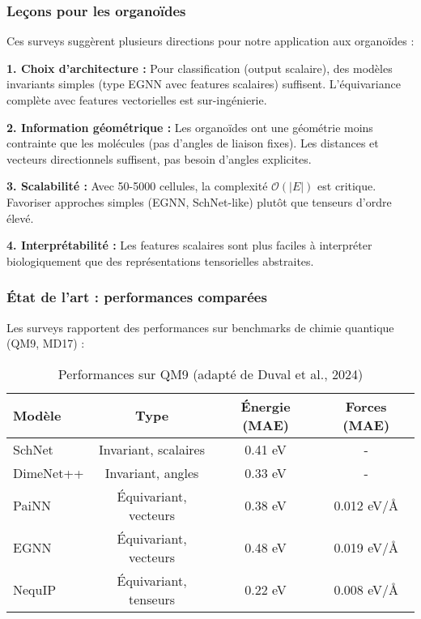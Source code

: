 \subsubsection{Leçons pour les organoïdes}

Ces surveys suggèrent plusieurs directions pour notre application aux organoïdes :

\textbf{1. Choix d'architecture :}
Pour classification (output scalaire), des modèles invariants simples (type EGNN avec features scalaires) suffisent. L'équivariance complète avec features vectorielles est sur-ingénierie.

\textbf{2. Information géométrique :}
Les organoïdes ont une géométrie moins contrainte que les molécules (pas d'angles de liaison fixes). Les distances et vecteurs directionnels suffisent, pas besoin d'angles explicites.

\textbf{3. Scalabilité :}
Avec 50-5000 cellules, la complexité $\mathcal{O}(|E|)$ est critique. Favoriser approches simples (EGNN, SchNet-like) plutôt que tenseurs d'ordre élevé.

\textbf{4. Interprétabilité :}
Les features scalaires sont plus faciles à interpréter biologiquement que des représentations tensorielles abstraites.

\subsubsection{État de l'art : performances comparées}

Les surveys rapportent des performances sur benchmarks de chimie quantique (QM9, MD17) :

\begin{table}[h]
\centering
\small
\begin{tabular}{lccc}
\hline
\textbf{Modèle} & \textbf{Type} & \textbf{Énergie (MAE)} & \textbf{Forces (MAE)} \\
\hline
SchNet & Invariant, scalaires & 0.41 eV & - \\
DimeNet++ & Invariant, angles & 0.33 eV & - \\
PaiNN & Équivariant, vecteurs & 0.38 eV & 0.012 eV/Å \\
EGNN & Équivariant, vecteurs & 0.48 eV & 0.019 eV/Å \\
NequIP & Équivariant, tenseurs & 0.22 eV & 0.008 eV/Å \\
\hline
\end{tabular}
\caption{Performances sur QM9 (adapté de Duval et al., 2024)}
\end{table}

